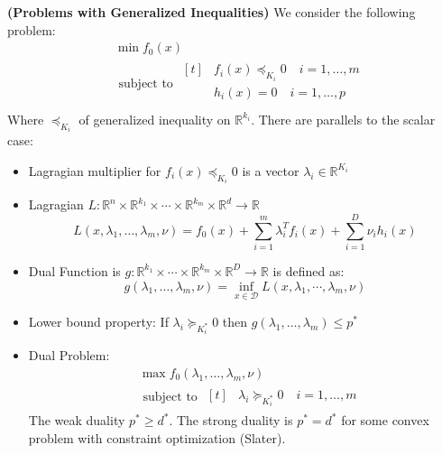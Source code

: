 \begin{definition}{\textbf{(Problems with Generalized Inequalities)}}
    We consider the following problem:
    \begin{equation*}
    \begin{aligned}
        &\min f_0(x) \\
        &\text{ subject to } \begin{aligned}[t]
            &f_i(x) \preceq_{K_i} 0 \quad i=1,\dots,m\\
            &h_i(x) = 0 \quad i=1,\dots,p\\
        \end{aligned}
    \end{aligned}        
    \end{equation*}
    Where $\preceq_{K_i}$ of generalized inequality on $\mathbb{R}^{k_i}$. There are parallels to the scalar case:
    \begin{itemize}
        \item Lagragian multiplier for $f_i(x)\preceq_{K_i}0$ is a vector $\lambda_i\in \mathbb{R}^{K_i}$
        \item Lagragian $L:\mathbb{R}^n\times \mathbb{R}^{k_1}\times\cdots\times \mathbb{R}^{k_m}\times \mathbb{R}^d \rightarrow \mathbb{R}$
        \begin{equation*}
            L(x, \lambda_1,\dots,\lambda_m,\nu) = f_0(x) + \sum^m_{i=1}\lambda_i^Tf_i(x) + \sum^D_{i=1}\nu_ih_i(x) 
        \end{equation*}
        \item Dual Function is $g:\mathbb{R}^{k_1}\times\cdots\times \mathbb{R}^{k_m}\times \mathbb{R}^D\rightarrow \mathbb{R}$ is defined as:
        \begin{equation*}
            g(\lambda_1,\dots,\lambda_m,\nu) = \inf_{x\in\mathcal{D}}L(x, \lambda_1, \cdots, \lambda_m, \nu)
        \end{equation*}
        \item Lower bound property: If $\lambda_i\succeq_{K^*_i}0$ then $g(\lambda_1,\dots,\lambda_m)\le p^*$
        \item Dual Problem:
        \begin{equation*}
        \begin{aligned}
            &\max f_0(\lambda_1,\dots,\lambda_m,\nu) \\
            &\text{ subject to } \begin{aligned}[t]
                &\lambda_i\succeq_{K^*_i}0 \quad i=1,\dots,m
            \end{aligned}
        \end{aligned}        
        \end{equation*}
        The weak duality $p^*\ge d^*$. The strong duality is $p^*=d^*$ for some convex problem with constraint optimization (Slater). 
    \end{itemize}
\end{definition}

